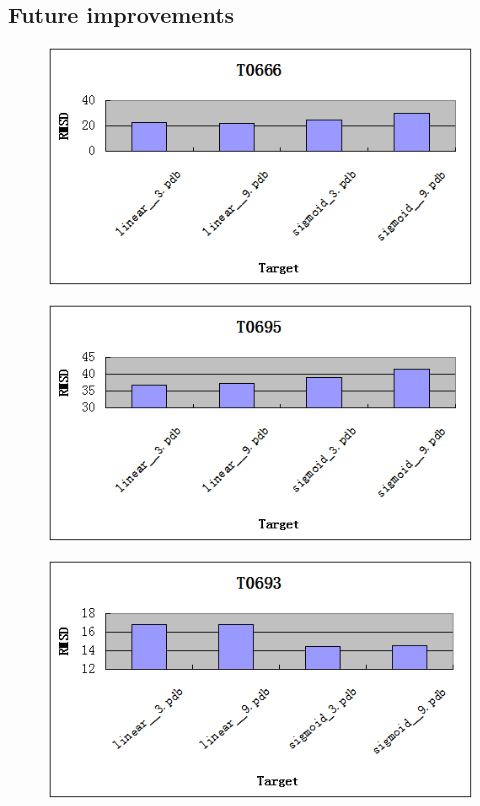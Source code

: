 \documentclass{article}
\begin{document}
\begin{enumerate}
\subsection{Future improvements}

\begin{figure}
\centering

\begin{minipage}{1.0\textwidth}
  \centering
  \includegraphics[width=.9\linewidth]{t0666}
  \label{fig:test1}
\end{minipage}%

\begin{minipage}{1.0\textwidth}
  \centering
  \includegraphics[width=.9\linewidth]{t0695}
  \label{fig:test2}
\end{minipage}

\begin{minipage}{1.0\textwidth}
  \centering
  \includegraphics[width=.9\linewidth]{t0693}
  \label{fig:test2}
\end{minipage}


\end{figure}
\end{enumerate}
\end{document}
